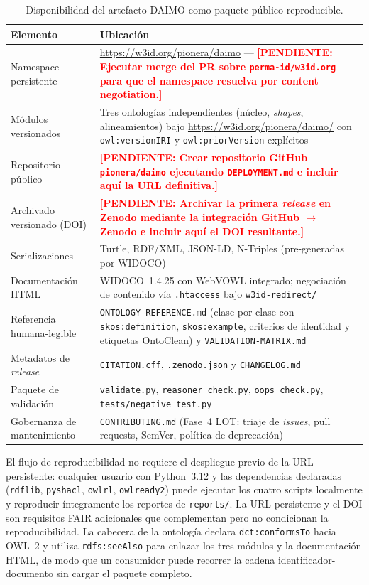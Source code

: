 \documentclass[Afour,sagev,times]{sagej}
\newcommand{\code}[1]{\texttt{#1}}
\newcommand{\TODO}[1]{\textcolor{red}{\textbf{[PENDIENTE: #1]}}}
\begin{document}
\begin{table}[t]
\small\sf\centering
\caption{Disponibilidad del artefacto DAIMO como paquete público reproducible.\label{tab:avail}}
\begin{tabular}{@{}p{4cm}p{11cm}@{}}
\toprule
\textbf{Elemento} & \textbf{Ubicación} \\
\midrule
Namespace persistente & \url{https://w3id.org/pionera/daimo} --- \TODO{Ejecutar merge del PR sobre \texttt{perma-id/w3id.org} para que el namespace resuelva por content negotiation.} \\
Módulos versionados & Tres ontologías independientes (núcleo, \emph{shapes}, alineamientos) bajo \url{https://w3id.org/pionera/daimo/} con \code{owl:versionIRI} y \code{owl:priorVersion} explícitos \\
Repositorio público & \TODO{Crear repositorio GitHub \texttt{pionera/daimo} ejecutando \texttt{DEPLOYMENT.md} e incluir aquí la URL definitiva.} \\
Archivado versionado (DOI) & \TODO{Archivar la primera \emph{release} en Zenodo mediante la integración GitHub $\to$ Zenodo e incluir aquí el DOI resultante.} \\
Serializaciones & Turtle, RDF/XML, JSON-LD, N-Triples (pre-generadas por WIDOCO) \\
Documentación HTML & WIDOCO~1.4.25 con WebVOWL integrado; negociación de contenido vía \code{.htaccess} bajo \code{w3id-redirect/} \\
Referencia humana-legible & \code{ONTOLOGY-REFERENCE.md} (clase por clase con \code{skos:definition}, \code{skos:example}, criterios de identidad y etiquetas OntoClean) y \code{VALIDATION-MATRIX.md} \\
Metadatos de \emph{release} & \code{CITATION.cff}, \code{.zenodo.json} y \code{CHANGELOG.md} \\
Paquete de validación & \code{validate.py}, \code{reasoner\_check.py}, \code{oops\_check.py}, \code{tests/negative\_test.py} \\
Gobernanza de mantenimiento & \code{CONTRIBUTING.md} (Fase~4 LOT: triaje de \emph{issues}, pull requests, SemVer, política de deprecación) \\
\bottomrule
\end{tabular}
\end{table}

El flujo de reproducibilidad no requiere el despliegue previo de la URL persistente: cualquier usuario con Python~3.12 y las dependencias declaradas (\code{rdflib}, \code{pyshacl}, \code{owlrl}, \code{owlready2}) puede ejecutar los cuatro scripts localmente y reproducir íntegramente los reportes de \code{reports/}. La URL persistente y el DOI son requisitos FAIR adicionales que complementan pero no condicionan la reproducibilidad. La cabecera de la ontología declara \code{dct:conformsTo} hacia OWL~2 y utiliza \code{rdfs:seeAlso} para enlazar los tres módulos y la documentación HTML, de modo que un consumidor puede recorrer la cadena identificador-documento sin cargar el paquete completo.
\end{document}
